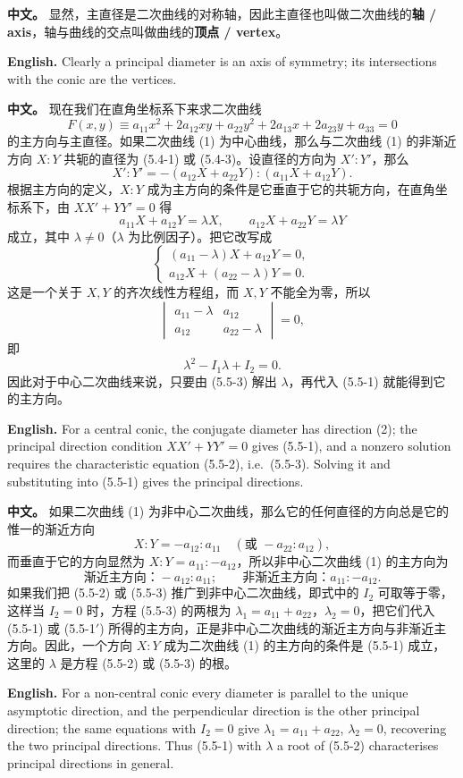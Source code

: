 \documentclass[UTF8,11pt,a4paper]{ctexart}
\newcommand{\APS}[2]{\par\noindent\textbf{中文。} #1\par\noindent\textbf{English.} #2\par\smallskip}
\theoremstyle{definition}
\begin{document}
\APS{显然，主直径是二次曲线的对称轴，因此主直径也叫做二次曲线的\textbf{轴 / axis}，轴与曲线的交点叫做曲线的\textbf{顶点 / vertex}。}{Clearly a principal diameter is an axis of symmetry; its intersections with the conic are the vertices.}

\APS{现在我们在直角坐标系下来求二次曲线
\[
F(x,y)\equiv a_{11}x^2+2a_{12}xy+a_{22}y^2+2a_{13}x+2a_{23}y+a_{33}=0\tag{1}
\]
的主方向与主直径。如果二次曲线 (1) 为中心曲线，那么与二次曲线 (1) 的非渐近方向 $X:Y$ 共轭的直径为 (5.4-1) 或 (5.4-3)。设直径的方向为 $X':Y'$，那么
\[
X':Y'=-(a_{12}X+a_{22}Y):(a_{11}X+a_{12}Y).\tag{2}
\]
根据主方向的定义，$X:Y$ 成为主方向的条件是它垂直于它的共轭方向，在直角坐标系下，由 $XX'+YY'=0$ 得
\[
a_{11}X+a_{12}Y=\lambda X,\qquad a_{12}X+a_{22}Y=\lambda Y\tag{5.5-1}
\]
成立，其中 $\lambda\ne0$（$\lambda$ 为比例因子）。把它改写成
\[
\begin{cases}(a_{11}-\lambda)X+a_{12}Y=0,\\ a_{12}X+(a_{22}-\lambda)Y=0.\end{cases}\tag{5.5-1$'$}
\]
这是一个关于 $X,Y$ 的齐次线性方程组，而 $X,Y$ 不能全为零，所以
\[
\begin{vmatrix}a_{11}-\lambda&a_{12}\\ a_{12}&a_{22}-\lambda\end{vmatrix}=0,\tag{5.5-2}
\]
即
\[
\lambda^2-I_1\lambda+I_2=0.\tag{5.5-3}
\]
因此对于中心二次曲线来说，只要由 (5.5-3) 解出 $\lambda$，再代入 (5.5-1) 就能得到它的主方向。}{For a central conic, the conjugate diameter has direction (2); the principal direction condition $XX'+YY'=0$ gives (5.5-1), and a nonzero solution requires the characteristic equation (5.5-2), i.e.\ (5.5-3). Solving it and substituting into (5.5-1) gives the principal directions.}

\APS{如果二次曲线 (1) 为非中心二次曲线，那么它的任何直径的方向总是它的惟一的渐近方向
\[
X:Y=-a_{12}:a_{11}\quad(\text{或 } -a_{22}:a_{12}),
\]
而垂直于它的方向显然为 $X:Y=a_{11}:-a_{12}$，所以非中心二次曲线 (1) 的主方向为
\[
\text{渐近主方向：}-a_{12}:a_{11};\qquad \text{非渐近主方向：}a_{11}:-a_{12}.
\]
如果我们把 (5.5-2) 或 (5.5-3) 推广到非中心二次曲线，即式中的 $I_2$ 可取等于零，这样当 $I_2=0$ 时，方程 (5.5-3) 的两根为 $\lambda_1=a_{11}+a_{22}$，$\lambda_2=0$，把它们代入 (5.5-1) 或 (5.5-1$'$) 所得的主方向，正是非中心二次曲线的渐近主方向与非渐近主方向。因此，一个方向 $X:Y$ 成为二次曲线 (1) 的主方向的条件是 (5.5-1) 成立，这里的 $\lambda$ 是方程 (5.5-2) 或 (5.5-3) 的根。}{For a non-central conic every diameter is parallel to the unique asymptotic direction, and the perpendicular direction is the other principal direction; the same equations with $I_2=0$ give $\lambda_1=a_{11}+a_{22}$, $\lambda_2=0$, recovering the two principal directions. Thus (5.5-1) with $\lambda$ a root of (5.5-2) characterises principal directions in general.}
\end{document}

